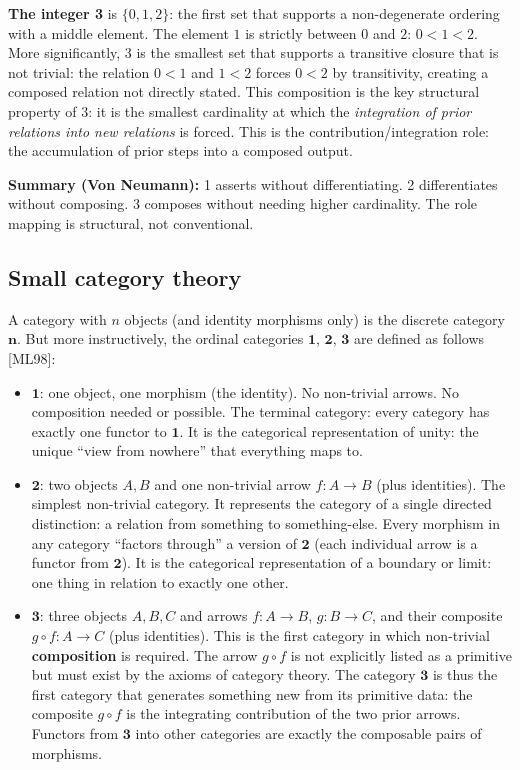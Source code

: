\documentclass[12pt]{article}
\begin{document}
\textbf{The integer 3} is \(\{0, 1, 2\}\): the first set that supports a
non-degenerate ordering with a middle element. The element \(1\) is
strictly between \(0\) and \(2\): \(0 < 1 < 2\). More significantly, 3
is the smallest set that supports a transitive closure that is not
trivial: the relation \(0 < 1\) and \(1 < 2\) forces \(0 < 2\) by
transitivity, creating a composed relation not directly stated. This
composition is the key structural property of 3: it is the smallest
cardinality at which the \emph{integration of prior relations into new
relations} is forced. This is the contribution/integration role: the
accumulation of prior steps into a composed output.

\textbf{Summary (Von Neumann):} 1 asserts without differentiating. 2
differentiates without composing. 3 composes without needing higher
cardinality. The role mapping is structural, not conventional.

\subsection{Small category theory}\label{small-category-theory}

A category with \(n\) objects (and identity morphisms only) is the
discrete category \(\mathbf{n}\). But more instructively, the ordinal
categories \(\mathbf{1}\), \(\mathbf{2}\), \(\mathbf{3}\) are defined as
follows {[}ML98{]}:

\begin{itemize}
\item
  \(\mathbf{1}\): one object, one morphism (the identity). No
  non-trivial arrows. No composition needed or possible. The terminal
  category: every category has exactly one functor to \(\mathbf{1}\). It
  is the categorical representation of unity: the unique ``view from
  nowhere'' that everything maps to.
\item
  \(\mathbf{2}\): two objects \(A, B\) and one non-trivial arrow
  \(f: A \to B\) (plus identities). The simplest non-trivial category.
  It represents the category of a single directed distinction: a
  relation from something to something-else. Every morphism in any
  category ``factors through'' a version of \(\mathbf{2}\) (each
  individual arrow is a functor from \(\mathbf{2}\)). It is the
  categorical representation of a boundary or limit: one thing in
  relation to exactly one other.
\item
  \(\mathbf{3}\): three objects \(A, B, C\) and arrows \(f: A \to B\),
  \(g: B \to C\), and their composite \(g \circ f: A \to C\) (plus
  identities). This is the first category in which non-trivial
  \textbf{composition} is required. The arrow \(g \circ f\) is not
  explicitly listed as a primitive but must exist by the axioms of
  category theory. The category \(\mathbf{3}\) is thus the first
  category that generates something new from its primitive data: the
  composite \(g \circ f\) is the integrating contribution of the two
  prior arrows. Functors from \(\mathbf{3}\) into other categories are
  exactly the composable pairs of morphisms.
\end{itemize}
\end{document}
